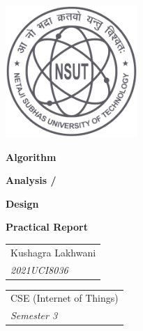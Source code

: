 \pagecolor{white}\afterpage{\nopagecolor}


\includegraphics[width=5cm]{images/NSUT.png}
\vspace{.8in}

\begin{singlespace}
    \fontsize{60}{65}\selectfont \textcolor{FSBlue}{\textbf{Algorithm}}

    \fontsize{60}{65}\selectfont \textcolor{FSBlue}{\textbf{Analysis /}}

    \fontsize{60}{65}\selectfont \textcolor{FSBlue}{\textbf{Design}}

    \vspace{5mm}
    \LARGE\textcolor{FSBlue}{\textbf{Practical Report}}

    \vfill

\end{singlespace}

\begin{singlespace}
    \LARGE

    \begin{tabular}{l}
        \textcolor{FSBlue}{Kushagra Lakhwani}    \\
        \textcolor{FSBlue}{\textit{2021UCI8036}} \\
    \end{tabular}

    \vspace{.2in}
    \begin{tabular}{l}
        \textcolor{FSBlue}{CSE (Internet of Things)} \\
        \textcolor{FSBlue}{\textit{Semester 3}}      \\
    \end{tabular}
\end{singlespace}

\thispagestyle{empty}
\restoregeometry
\newpage